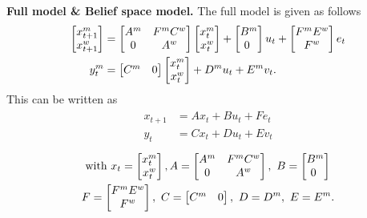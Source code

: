 \documentclass{ifacconf}
\begin{document}
\textbf{Full model \& Belief space model.}
The full model is given as follows
\begin{align} 
	\begin{bmatrix}
	x^m_{t+1}	\\x^w_{t+1}
	\end{bmatrix}
 &= \begin{bmatrix}
 	A^m 	& F^mC^w\\
 	0 & A^w
 \end{bmatrix}
\begin{bmatrix}
	x^m_{t}	\\x^w_{t}
	\end{bmatrix}+\begin{bmatrix} B^m \\ 0~ \end{bmatrix} u_{t}+  \begin{bmatrix}
	F^m E^w \\
	F^w
	\end{bmatrix}e_{t}\notag\\
	y^m_{t}&=\begin{bmatrix} C^m& 0 \end{bmatrix}\begin{bmatrix}
	x^m_{t}	\\x^w_{t}
	\end{bmatrix}+D^m u_{t}+E^m v_{t}.
\end{align}
This can be written as 
 \begin{align}  \begin{aligned}
x_{t+1}&=A x_{t} + B u_t+ Fe_t\\
y_t&=Cx_t+Du_t+Ev_t\end{aligned} \end{align}
\begin{align}& \mbox{ with }  x_t	= \begin{bmatrix}
	x^m_{t}	\\x^w_{t}
	\end{bmatrix},
A = \begin{bmatrix}
 	A^m 	& F^mC^w\\
 	0 & A^w
 \end{bmatrix}, \ 
B = \begin{bmatrix} B^m \\ 0~ \end{bmatrix}\notag \\
&F=\begin{bmatrix}
	F^m E^w \\
	F^w
	\end{bmatrix},\ 
C = \begin{bmatrix} C^m& 0 \end{bmatrix} , \ 
D= D^m, \  E = E^m.\notag
\end{align}
 
\end{document}
